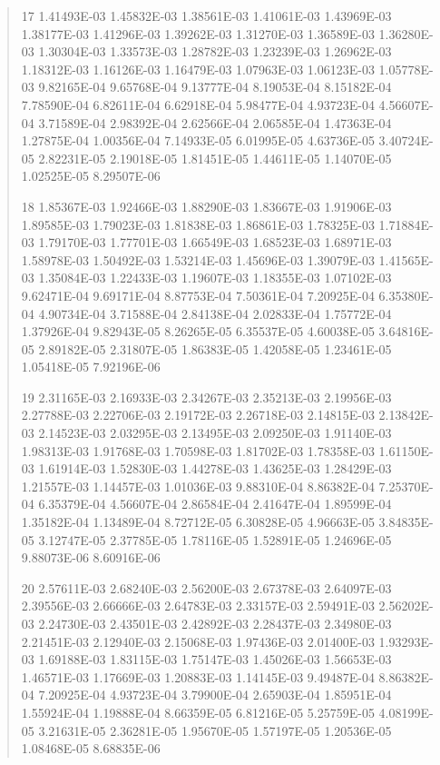\documentclass[letterpaper,10pt,english]{sphinxmanual}
\begin{document}
\begin{quote}
\begin{DUlineblock}{0em}
\item[] 17   1.41493E-03  1.45832E-03  1.38561E-03  1.41061E-03  1.43969E-03  1.38177E-03  1.41296E-03  1.39262E-03  1.31270E-03  1.36589E-03  1.36280E-03  1.30304E-03  1.33573E-03  1.28782E-03  1.23239E-03  1.26962E-03  1.18312E-03  1.16126E-03  1.16479E-03  1.07963E-03  1.06123E-03  1.05778E-03  9.82165E-04  9.65768E-04  9.13777E-04  8.19053E-04  8.15182E-04  7.78590E-04  6.82611E-04  6.62918E-04  5.98477E-04  4.93723E-04  4.56607E-04  3.71589E-04  2.98392E-04  2.62566E-04  2.06585E-04  1.47363E-04  1.27875E-04  1.00356E-04  7.14933E-05  6.01995E-05  4.63736E-05  3.40724E-05  2.82231E-05  2.19018E-05  1.81451E-05  1.44611E-05  1.14070E-05  1.02525E-05  8.29507E-06
\item[] 18   1.85367E-03  1.92466E-03  1.88290E-03  1.83667E-03  1.91906E-03  1.89585E-03  1.79023E-03  1.81838E-03  1.86861E-03  1.78325E-03  1.71884E-03  1.79170E-03  1.77701E-03  1.66549E-03  1.68523E-03  1.68971E-03  1.58978E-03  1.50492E-03  1.53214E-03  1.45696E-03  1.39079E-03  1.41565E-03  1.35084E-03  1.22433E-03  1.19607E-03  1.18355E-03  1.07102E-03  9.62471E-04  9.69171E-04  8.87753E-04  7.50361E-04  7.20925E-04  6.35380E-04  4.90734E-04  3.71588E-04  2.84138E-04  2.02833E-04  1.75772E-04  1.37926E-04  9.82943E-05  8.26265E-05  6.35537E-05  4.60038E-05  3.64816E-05  2.89182E-05  2.31807E-05  1.86383E-05  1.42058E-05  1.23461E-05  1.05418E-05  7.92196E-06
\item[] 19   2.31165E-03  2.16933E-03  2.34267E-03  2.35213E-03  2.19956E-03  2.27788E-03  2.22706E-03  2.19172E-03  2.26718E-03  2.14815E-03  2.13842E-03  2.14523E-03  2.03295E-03  2.13495E-03  2.09250E-03  1.91140E-03  1.98313E-03  1.91768E-03  1.70598E-03  1.81702E-03  1.78358E-03  1.61150E-03  1.61914E-03  1.52830E-03  1.44278E-03  1.43625E-03  1.28429E-03  1.21557E-03  1.14457E-03  1.01036E-03  9.88310E-04  8.86382E-04  7.25370E-04  6.35379E-04  4.56607E-04  2.86584E-04  2.41647E-04  1.89599E-04  1.35182E-04  1.13489E-04  8.72712E-05  6.30828E-05  4.96663E-05  3.84835E-05  3.12747E-05  2.37785E-05  1.78116E-05  1.52891E-05  1.24696E-05  9.88073E-06  8.60916E-06
\item[] 20   2.57611E-03  2.68240E-03  2.56200E-03  2.67378E-03  2.64097E-03  2.39556E-03  2.66666E-03  2.64783E-03  2.33157E-03  2.59491E-03  2.56202E-03  2.24730E-03  2.43501E-03  2.42892E-03  2.28437E-03  2.34980E-03  2.21451E-03  2.12940E-03  2.15068E-03  1.97436E-03  2.01400E-03  1.93293E-03  1.69188E-03  1.83115E-03  1.75147E-03  1.45026E-03  1.56653E-03  1.46571E-03  1.17669E-03  1.20883E-03  1.14145E-03  9.49487E-04  8.86382E-04  7.20925E-04  4.93723E-04  3.79900E-04  2.65903E-04  1.85951E-04  1.55924E-04  1.19888E-04  8.66359E-05  6.81216E-05  5.25759E-05  4.08199E-05  3.21631E-05  2.36281E-05  1.95670E-05  1.57197E-05  1.20536E-05  1.08468E-05  8.68835E-06

\end{DUlineblock}
\end{quote}
\end{document}
